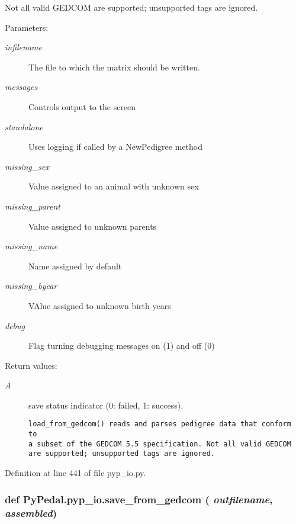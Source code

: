 Not all valid GEDCOM are supported; unsupported tags are ignored. \begin{Desc}
\item[Parameters:]
\begin{description}
\item[{\em infilename}]The file to which the matrix should be written. \item[{\em messages}]Controls output to the screen \item[{\em standalone}]Uses logging if called by a New\-Pedigree method \item[{\em missing\_\-sex}]Value assigned to an animal with unknown sex \item[{\em missing\_\-parent}]Value assigned to unknown parents \item[{\em missing\_\-name}]Name assigned by default \item[{\em missing\_\-byear}]VAlue assigned to unknown birth years \item[{\em debug}]Flag turning debugging messages on (1) and off (0) \end{description}
\end{Desc}
\begin{Desc}
\item[Return values:]
\begin{description}
\item[{\em A}]save status indicator (0: failed, 1: success).

\footnotesize\begin{verbatim}load_from_gedcom() reads and parses pedigree data that conform to
a subset of the GEDCOM 5.5 specification. Not all valid GEDCOM
are supported; unsupported tags are ignored.
\end{verbatim}
\normalsize
 \end{description}
\end{Desc}


Definition at line 441 of file pyp\_\-io.py.\hypertarget{namespacePyPedal_1_1pyp__io_1f13533bd51ef47b9b12486ce509c0e3}{
\subsubsection[save\_\-from\_\-gedcom]{\setlength{\rightskip}{0pt plus 5cm}def Py\-Pedal.pyp\_\-io.save\_\-from\_\-gedcom ( {\em outfilename},  {\em assembled})}}
\label{namespacePyPedal_1_1pyp__io_1f13533bd51ef47b9b12486ce509c0e3}


